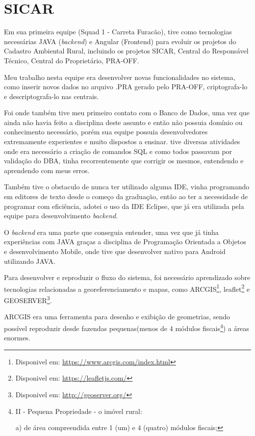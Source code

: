 \section{SICAR}

Em sua primeira equipe (Squad 1 - Carreta Furacão), tive como tecnologias necessárias JAVA (\textit{backend}) e Angular (Frontend) para evoluir os projetos do Cadastro Ambiental Rural, incluindo os projetos SICAR, Central do Responsável Técnico, Central do Proprietário, PRA-OFF.

Meu trabalho nesta equipe era desenvolver novas funcionalidades no sistema, como inserir novos dados no arquivo .PRA gerado pelo PRA-OFF, criptografa-lo e descriptografa-lo nas centrais.

Foi onde também tive meu primeiro contato com o Banco de Dados, uma vez que ainda não havia feito a disciplina deste assunto e então não possuia domínio ou conhecimento necessário, porém sua equipe possuia desenvolvedores extremamente experientes e muito dispostos a ensinar.
tive diversas atividades onde era necessário a criação de comandos SQL e como todos passavam por validação do DBA, tinha recorrentemente que corrigir os mesmos, entendendo e aprendendo com meus erros.

Também tive o obstaculo de nunca ter utilizado alguma IDE, vinha programando em editores de texto desde o começo da graduação, então ao ter a necessidade de programar com eficiência, adotei o uso da IDE Eclipse, que já era utilizada pela equipe para desenvolvimento \textit{backend}.

O \textit{backend} era uma parte que conseguia entender, uma vez que já tinha experiências com JAVA graças a disciplina de Programação Orientada a Objetos e desenvolvimento Mobile, onde tive que desenvolver nativo para Android utilizando JAVA.

Para desenvolver e reproduzir o fluxo do sistema, foi necessário aprendizado sobre tecnologias relacionadas a georeferenciamento e mapas, como ARCGIS\footnote{Disponivel em: \url{https://www.arcgis.com/index.html}}, leaflet\footnote{Disponivel em: \url{https://leafletjs.com/}} e GEOSERVER\footnote{Disponivel em: \url{http://geoserver.org/}}.

ARCGIS era uma ferramenta para desenho e exibição de geometrias, sendo possível reproduzir desde fazendas pequenas(menos de 4 módulos fiscais\footnote{II - Pequena Propriedade - o imóvel rural:

a) de área compreendida entre 1 (um) e 4 (quatro) módulos fiscais;\cite{brasil1993}}) a áreas enormes.

